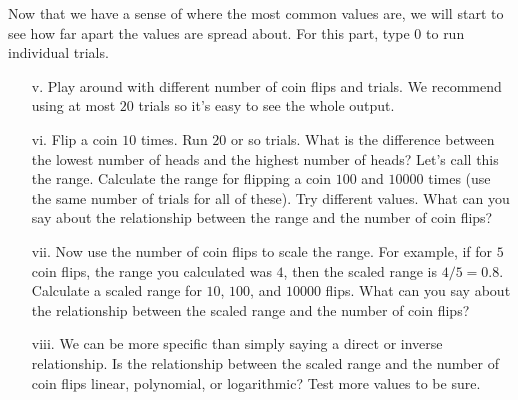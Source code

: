 \documentclass[11pt]{article}
\newif\ifsolutions
\begin{document}
\begin{enumerate}
\begin{enumerate}
\ifsolutions
{\color{blue}{Solution: The most common value should be $n/2$ for a sufficient number of trials. If we flip a coin twice ($n=2$), the options are HH, HT, TH, and TT. So half the time we should see the most common value be $1$ Head.
}}
\fi

\end{enumerate}
Now that we have a sense of where the most common values are, we will start to see how far apart the values are spread about. For this part, type $0$ to run individual trials. 
\begin{enumerate}
\item[v.] Play around with different number of coin flips and trials. We recommend using at most $20$ trials so it's easy to see the whole output.

\item[vi.] Flip a coin $10$ times. Run $20$ or so trials. What is the difference between the lowest number of heads and the highest number of heads? Let's call this the range. Calculate the range for flipping a coin $100$ and $10000$ times (use the same number of trials for all of these). Try different values. What can you say about the relationship between the range and the number of coin flips?

\ifsolutions
{\color{blue}{Solution: For $10$ coin flips, an example range might be $8-3=5$. For $100$ coin flips, an example range might be $61-40=21$. For $10000$ coin flips an example range might be $5088-4894=194$. We can see that it increases as we flip more coins, even with the same number of trials.
}}
\fi

\item[vii.] Now use the number of coin flips to scale the range. For example, if for $5$ coin flips, the range you calculated was $4$, then the scaled range is $4/5=0.8$. Calculate a scaled range for $10$, $100$, and $10000$ flips. What can you say about the relationship between the scaled range and the number of coin flips?

\ifsolutions
{\color{blue}{Solution: Our scaled ranges above would be $5/10=0.5$, $21/100=0.21$, $194/10000=0.0194$, which decrease with the number of flips.}}
\fi

\item[viii.] We can be more specific than simply saying a direct or inverse relationship. Is the relationship between the scaled range and the number of coin flips linear, polynomial, or logarithmic? Test more values to be sure.

\ifsolutions
{\color{blue}{Solution: With one more point $59/1000=0.059$, it looks logarithmic.}}
\fi


\end{enumerate}
\end{enumerate}
\end{document}
